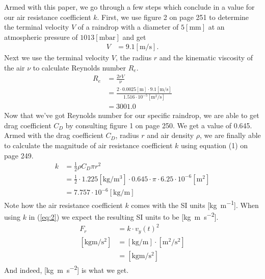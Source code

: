 \documentclass[paper=a4, fontsize=11pt]{scrartcl} %
\numberwithin{equation}{section} %
\numberwithin{figure}{section} %
\numberwithin{table}{section} %
\begin{document}
Armed with this paper, we go through a few steps which conclude in a value for our air resistance coefficient $k$.
First, we use figure 2 on page 251 to determine the terminal velocity $V$ of a raindrop with a diameter of $5[\si{\milli\meter}]$
at an atmospheric pressure of $1013[\si{\milli\bar}]$ and get 
\begin{align} \label{eq:2.5}
V &= 9.1[\si{\meter\per\second}].
\end{align}
Next we use the terminal velocity $V$, the radius $r$ and the kinematic viscosity of the air $\nu$ to calculate Reynolds number $R_e$.
\begin{align} \label{eq:3}
R_e &= \frac{2rV}{\nu} \\
    &= \frac{2 \cdot 0.0025[\si{\meter}] \cdot 9.1 [\si{\meter\per\second}]}{1.516 \cdot 10^{-5}[\si{\meter\squared\per\second}]} \\
    &= 3001.0
\end{align}
Now that we've got Reynolds number for our specific raindrop, we are able to get drag coefficient $C_D$ by consulting figure 1
on page 250. We get a value of 0.645. Armed with the drag coefficient $C_D$, radius $r$ and air density 
$\rho$, we are finally able to calculate the magnitude of air resistance coefficient $k$ using equation (1) on page 249.
\begin{align} \label{eq:4}
k &= \frac{1}{2} \rho C_D \pi r^2 \\
  &= \frac{1}{2} \cdot 1.225 [\si{\kilogram\per\meter\cubed}] \cdot 0.645 \cdot \pi \cdot 6.25 \cdot 10^{-6} [\si{\meter\squared}] \\
  &=  7.757 \cdot 10^{-6}[\si{\kilogram\per\meter}]
\end{align}
Note how the air resistance coefficient $k$ comes with the SI units [\si{\kilogram\per\meter}].
When using $k$ in (\ref{eq:2}) we expect the resulting SI units to be [\si{\kilogram\meter\per\second\squared}].
\begin{align} \label{eq:5}
F_r &= k \cdot v_y(t)^2 \\
[\si{\kilogram\meter\per\second\squared}]  &= [\si{\kilogram\per\meter}] \cdot [\si{\meter\squared\per\second\squared}] \\
  &= [\si{\kilogram\meter\per\second\squared}]
\end{align}
And indeed, [\si{\kilogram\meter\per\second\squared}] is what we get.
\end{document}
